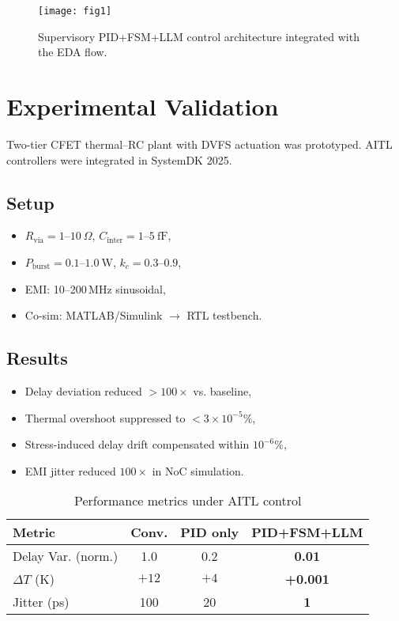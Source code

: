 \documentclass[conference]{IEEEtran}
\begin{document}
\begin{figure}[t]
  \centering
  \texttt{[image: fig1]}
  \caption{Supervisory PID+FSM+LLM control architecture integrated with the EDA flow.}
  \label{fig:arch}
\end{figure}

\section{Experimental Validation}
Two-tier CFET thermal--RC plant with DVFS actuation was prototyped. AITL controllers were integrated in SystemDK 2025.

\subsection{Setup}
\begin{itemize}
\item $R_{\mathrm{via}}=1$--$10~\Omega$, $C_{\mathrm{inter}}=1$--$5~\mathrm{fF}$,
\item $P_{\mathrm{burst}}=0.1$--$1.0~\mathrm{W}$, $k_c=0.3$--$0.9$,
\item EMI: 10--200\,MHz sinusoidal,
\item Co-sim: MATLAB/Simulink $\rightarrow$ RTL testbench.
\end{itemize}

\subsection{Results}
\begin{itemize}
\item Delay deviation reduced $>100\times$ vs. baseline,
\item Thermal overshoot suppressed to $<3\times10^{-5}\%$,
\item Stress-induced delay drift compensated within $10^{-6}\%$,
\item EMI jitter reduced $100\times$ in NoC simulation.
\end{itemize}

\begin{table}[t]
\caption{Performance metrics under AITL control}
\label{tab:perf}
\centering
\begin{tabular}{lccc}
\hline
Metric & Conv. & PID only & PID+FSM+LLM\\
\hline
Delay Var. (norm.) & 1.0 & 0.2 & \textbf{0.01}\\
$\Delta T$ (K) & $+12$ & $+4$ & \textbf{+0.001}\\
Jitter (ps) & 100 & 20 & \textbf{1}\\
\hline
\end{tabular}
\end{table}
\end{document}
